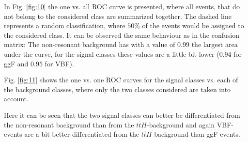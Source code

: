 
In Fig. \ref{fig:10} the one vs. all ROC curve is presented,
where all events, that do not belong to the considered class are summarized together. The dashed line represents a random classification, where $50 \%$ of the events would be assigned to the considered
class. It can be observed the same behaviour as in the confusion matrix: The non-resonant background has with a value of $0.99$ the largest area under the curve, for the signal classes these
values are a little bit lower ($0.94$ for ggF and $0.95$ for VBF).

Fig. \ref{fig:11} shows the one vs. one ROC curves for the signal classes vs. each of the background classes, where only the two classes considered are taken into account. 


Here it can be seen that the two signal classes can better be differentiated from the non-resonant background than from the $t \bar{t}H$-background and again VBF-events are a bit
better differentiated from the $t \bar{t}H$-background than ggF-events. 

